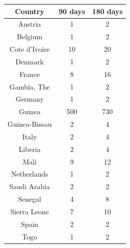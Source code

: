 \documentclass[10pt, journal,onecolumn]{IEEEtran}
\begin{document}
    \begin{tabular}{ |c|c|c| }
      \hline
      \textbf{Country} & \textbf{90 days} & \textbf{180 days} \\
      \hline
      Austria	& 1 & 2 \\
      Belgium	& 1 & 2 \\
      Cote d'Ivoire	& 10 & 20 \\
      Denmark	& 1 & 2 \\
      France	& 8 & 16 \\
      Gambia, The	& 1 & 2 \\
      Germany	& 1 & 2 \\
      Guinea	& 500 & 730 \\
      Guinea-Bissau	& 2 & 4 \\
      Italy	& 2 & 4 \\
      Liberia	& 2 & 4 \\
      Mali	& 9 & 12 \\
      Netherlands	& 1 & 2 \\
      Saudi Arabia	& 2 & 2 \\
      Senegal	& 4 & 8 \\
      Sierra Leone	& 7 & 10 \\
      Spain	& 2 & 2 \\
      Togo	& 1 & 2 \\
      \hline
    \end{tabular}
\end{document}
